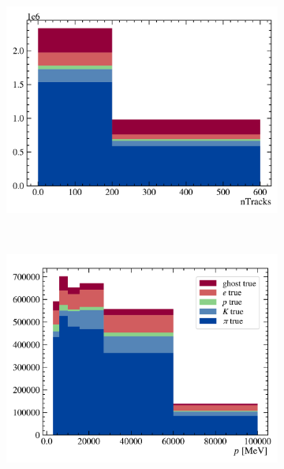 \begin{figure}[htb]
    \begin{subfigure}[b]{0.32\textwidth}
        \centering
        \includegraphics[width=\textwidth]{figs-fit-fit-templates/data-driven-plots/misid/D0-tag_ntracks.pdf}
    \end{subfigure}
    \\
    \begin{subfigure}[b]{0.32\textwidth}
        \centering
        \includegraphics[width=\textwidth]{figs-fit-fit-templates/data-driven-plots/misid/D0-true_p.pdf}
    \end{subfigure}
    \hfill
    \begin{subfigure}[b]{0.32\textwidth}
        \centering

\end{subfigure}
\end{figure}
